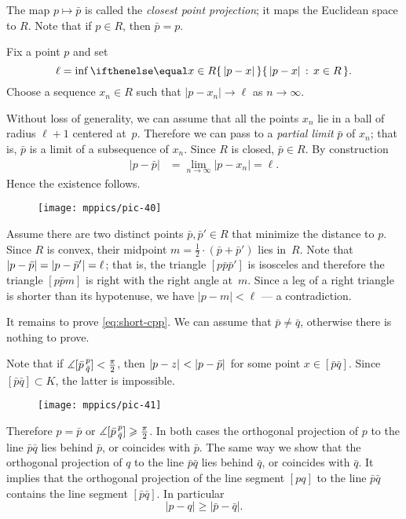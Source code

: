 The map $p\mapsto \bar p$ is called the \label{closest point projection}\emph{closest point projection};
it maps the Euclidean space to $R$.
Note that if $p\in R$, then $\bar p=p$.

Fix a point $p$ and set 
\[\ell=\inf\set{|p-x|}{x\in R}.\]
Choose a sequence $x_n\in R$ such that $|p-x_n|\to \ell$ as $n\to\infty$.

Without loss of generality, we can assume that all the points $x_n$ lie in a ball of radius $\ell+1$ centered at~$p$.
Therefore we can pass to a \emph{partial limit} $\bar p$ of $x_n$; that is, $\bar p$ is a limit of a subsequence of $x_n$.
Since $R$ is closed, $\bar p\in R$.
By construction 
\begin{align*}
|p-\bar p|&=\lim_{n\to\infty}|p-x_n|=\ell.
\end{align*}
Hence the existence follows.

{

\begin{wrapfigure}{r}{22 mm}
\vskip-0mm
\centering
\texttt{[image: mppics/pic-40]}
\vskip-0mm
\end{wrapfigure}

Assume there are two distinct points $\bar p, \bar p'\in R$ that minimize the distance to $p$.
Since $R$ is convex, their midpoint $m=\tfrac12\cdot (\bar p+\bar p')$ lies in~$R$.
Note that $|p-\bar p|\z=|p-\bar p'|=\ell$; that is, the triangle $[p\bar p\bar p']$ is isosceles and therefore the triangle $[p\bar p m]$ is right with the right angle at~$m$.
Since a leg of a right triangle is shorter than its hypotenuse, we have $|p-m|<\ell$ --- a contradiction. 

It remains to prove \ref{eq:short-cpp}.
We can assume that $\bar p\ne\bar q$, otherwise there is nothing to prove.

}

Note that if $\measuredangle [\bar p\,{}^{p}_{\bar q}]< \tfrac\pi2$, then $\dist{p}{z}{}\z<\dist{p}{\bar p}{}$ for some point $x\in [\bar p\bar q]$.
Since $[\bar p\bar q]\subset K$,
the latter is impossible.

\begin{wrapfigure}{l}{37 mm}
\vskip-0mm
\centering
\texttt{[image: mppics/pic-41]}
\vskip-0mm
\end{wrapfigure}

Therefore $p=\bar p$ or $\measuredangle [\bar p\,{}^{p}_{\bar q}]\geqslant \tfrac\pi2$.
In both cases the orthogonal projection of $p$ to the line $\bar p\bar q$ lies behind $\bar p$, or coincides with $\bar p$.
The same way we show that the orthogonal projection of $q$ to the line $\bar p\bar q$ lies behind $\bar q$, or coincides with $\bar q$.
It implies that the orthogonal projection of the line segment $[pq]$ to the line $\bar p\bar q$ contains the line segment $[\bar p\bar q]$.
In particular 
\[|p-q|\ge |\bar p-\bar q|.\]
\qedsf

